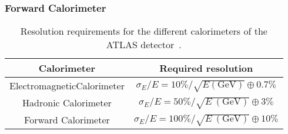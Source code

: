 


\subsubsection{Forward Calorimeter}
\label{subsubsec:ae_fcal}











\begin{table}[htbp]
\begin{center}
\begin{tabular}{cc}
\hline
\hline
Calorimeter & Required resolution\\
\hline
ElectromagneticCalorimeter & $\sigma_{E}/E = 10\% / \sqrt{E\mathrm{ (GeV)}} \oplus 0.7\%$\\
Hadronic Calorimeter & $\sigma_{E}/E = 50\% / \sqrt{E~\mathrm{(GeV)}} \oplus 3\%$\\
Forward Calorimeter & $\sigma_{E}/E = 100\% / \sqrt{E~\mathrm{(GeV)}} \oplus 10\%$\\
\hline
\hline
\end{tabular}
\end{center}
\caption{Resolution requirements for the different calorimeters of the ATLAS detector~\cite{1748-0221-3-08-S08003}.}
\label{tab:ae_}
\end{table}%

